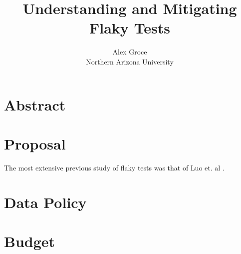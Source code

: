 \documentclass{article}
\title{Understanding and Mitigating Flaky Tests}
\author{Alex Groce\\Northern Arizona University}
\begin{document}
\maketitle

\section{Abstract}
\section{Proposal}

The most extensive previous study of flaky tests was that of Luo et. al \cite{luo2014empirical}.




\section{Data Policy}
\section{Budget}
\end{document}
